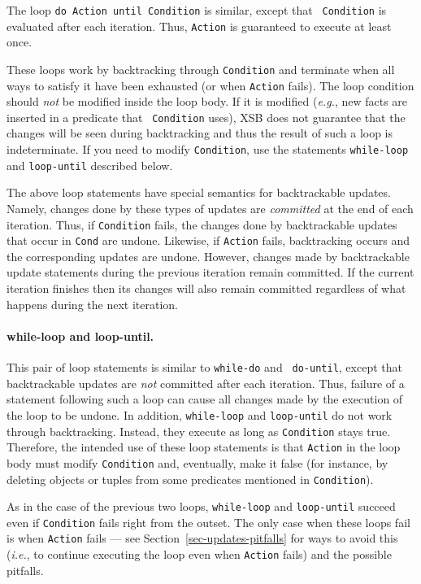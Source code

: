\documentclass[11pt]{article}
\begin{document}
The loop {\tt do Action until Condition} is similar, except that {\tt
  Condition} is evaluated after each iteration. Thus, {\tt Action} is
guaranteed to execute at least once.

These loops work by backtracking through {\tt Condition} and terminate when
all ways to satisfy it have been exhausted (or when {\tt Action} fails).
The loop condition should \emph{not} be modified inside the loop body.  If
it is modified ({\it e.g.}, new facts are inserted in a predicate that {\tt
  Condition} uses), XSB does not guarantee that the changes will be seen
during backtracking and thus the result of such a loop is indeterminate.
If you need to modify {\tt Condition}, use the statements {\tt while-loop}
and {\tt loop-until} described below.

The above loop statements have special semantics for backtrackable updates.
Namely, changes done by these types of updates are \emph{committed} at the
end of each iteration. Thus, if {\tt Condition} fails, the changes done by
backtrackable updates that occur in {\tt Cond} are undone. Likewise, if
{\tt Action} fails, backtracking occurs and the corresponding updates are
undone. However, changes made by backtrackable update statements during the
previous iteration remain committed. If the current iteration finishes then
its changes will also remain committed regardless of what happens during
the next iteration.


\paragraph{while-loop and loop-until.}
This pair of loop statements is similar to {\tt while-do} and {\tt
  do-until}, except that backtrackable updates are \emph{not} committed
after each iteration. Thus, failure of a statement following such a loop
can cause all changes made by the execution of the loop to be undone.  In
addition, {\tt while-loop} and {\tt loop-until} do not work through
backtracking. Instead, they execute as long as {\tt Condition} stays true.
Therefore, the intended use of these loop statements is that {\tt Action}
in the loop body must modify {\tt Condition} and, eventually, make it false
(for instance, by deleting objects or tuples from some predicates mentioned
in {\tt Condition}).
  
As in the case of the previous two loops, {\tt while-loop} and
{\tt loop-until} succeed even if {\tt Condition} fails right from the
outset. The only case when these loops fail is when {\tt Action} fails ---
see Section~\ref{sec-updates-pitfalls} for ways to avoid this ({\it i.e.},
to continue executing the loop even when {\tt Action} fails) and the
possible pitfalls.
\end{document}
